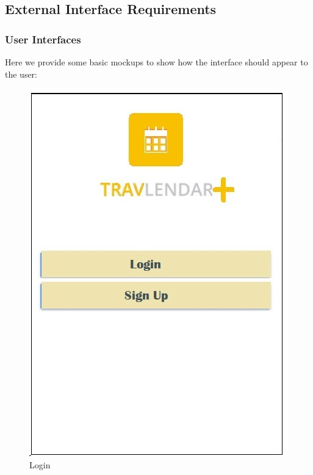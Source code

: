 \subsection{External Interface Requirements}
	\subsubsection{User Interfaces}
		Here we provide some basic mockups to show how the interface should appear to the user:\newline
		
		\begin{figure}[H]	
			\centerline{\includegraphics[scale=0.4]{Images/Login}}
			\caption{Login}
		\end{figure}	
